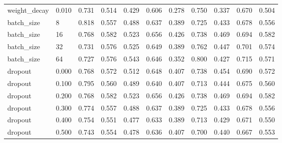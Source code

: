 \begin{tabular}{llrrrrrrrrr}
weight_decay & 0.010 & 0.731 & 0.514 & 0.429 & 0.606 & 0.278 & 0.750 & 0.337 & 0.670 & 0.504 \\
batch_size & 8 & 0.818 & 0.557 & 0.488 & 0.637 & 0.389 & 0.725 & 0.433 & 0.678 & 0.556 \\
batch_size & 16 & 0.768 & 0.582 & 0.523 & 0.656 & 0.426 & 0.738 & 0.469 & 0.694 & 0.582 \\
batch_size & 32 & 0.731 & 0.576 & 0.525 & 0.649 & 0.389 & 0.762 & 0.447 & 0.701 & 0.574 \\
batch_size & 64 & 0.727 & 0.576 & 0.543 & 0.646 & 0.352 & 0.800 & 0.427 & 0.715 & 0.571 \\
dropout & 0.000 & 0.768 & 0.572 & 0.512 & 0.648 & 0.407 & 0.738 & 0.454 & 0.690 & 0.572 \\
dropout & 0.100 & 0.795 & 0.560 & 0.489 & 0.640 & 0.407 & 0.713 & 0.444 & 0.675 & 0.560 \\
dropout & 0.200 & 0.768 & 0.582 & 0.523 & 0.656 & 0.426 & 0.738 & 0.469 & 0.694 & 0.582 \\
dropout & 0.300 & 0.774 & 0.557 & 0.488 & 0.637 & 0.389 & 0.725 & 0.433 & 0.678 & 0.556 \\
dropout & 0.400 & 0.754 & 0.551 & 0.477 & 0.633 & 0.389 & 0.713 & 0.429 & 0.671 & 0.550 \\
dropout & 0.500 & 0.743 & 0.554 & 0.478 & 0.636 & 0.407 & 0.700 & 0.440 & 0.667 & 0.553 \\
\bottomrule
\end{tabular}
